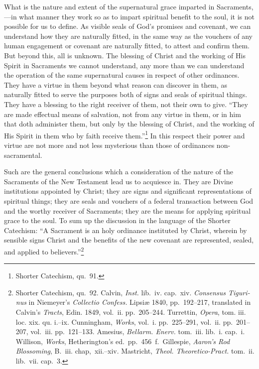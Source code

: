 \documentclass[
]{book}
\begin{document}
What is the nature and extent of the supernatural grace imparted in Sacraments,---in what manner they work so as to impart spiritual benefit to the soul, it is not possible for us to define. As visible seals of God's promises and covenant, we can understand how they are naturally fitted, in the same way as the vouchers of any human engagement or covenant are naturally fitted, to attest and confirm them. But beyond this, all is unknown. The blessing of Christ and the working of His Spirit in Sacraments we cannot understand, any more than we can understand the operation of the same supernatural causes in respect of other ordinances. They have a virtue in them beyond what reason can discover in them, as naturally fitted to serve the purposes both of signs and seals of spiritual things. They have a blessing to the right receiver of them, not their own to give. ``They are made effectual means of salvation, not from any virtue in them, or in him that doth administer them, but only by the blessing of Christ, and the working of His Spirit in them who by faith receive them.''\footnote{Shorter Catechism, qu.~91.} In this respect their power and virtue are not more and not less mysterious than those of ordinances non-sacramental.

Such are the general conclusions which a consideration of the nature of the Sacraments of the New Testament lead us to acquiesce in. They are Divine institutions appointed by Christ; they are signs and significant representations of spiritual things; they are seals and vouchers of a federal transaction between God and the worthy receiver of Sacraments; they are the means for applying spiritual grace to the soul. To sum up the discussion in the language of the Shorter Catechism: ``A Sacrament is an holy ordinance instituted by Christ, wherein by sensible signs Christ and the benefits of the new covenant are represented, sealed, and applied to believers.''\footnote{Shorter Catechism, qu.~92. Calvin, \emph{Inst.} lib.~iv. cap.~xiv. \foreignlanguage{latin}{\emph{Consensus Tigurinus}} in Niemeyer's \foreignlanguage{latin}{\emph{Collectio Confess.} Lipsiæ} 1840, pp.~192--217, translated in Calvin's \emph{Tracts}, Edin. 1849, vol.~ii. pp.~205--244. Turrettin, \emph{Opera}, tom. iii. loc. xix. qu. i.--ix. Cunningham, \emph{Works}, vol.~i. pp.~225--291, vol.~ii. pp.~201--207, vol.~iii. pp.~121--133. Amesius, \emph{Bellarm. Enerv.} tom.~iii. lib.~i. cap.~i. Willison, \emph{Works}, Hetherington's ed.~pp.~456~f.~Gillespie, \emph{Aaron's Rod Blossoming}, B.~iii. chap,~xii.--xiv. Mastricht, \emph{Theol. Theoretico-Pract.} tom.~ii. lib.~vii. cap.~3.}
\end{document}
